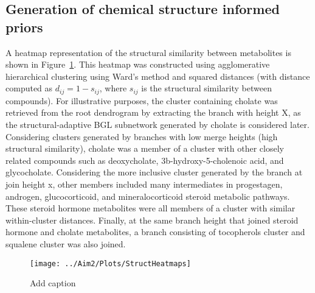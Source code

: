 \begin{DoubleSpace*}
\section{Generation of chemical structure informed priors}
A heatmap representation of the structural similarity between metabolites is shown in Figure~\ref{fig:heatmap}. This heatmap was constructed using agglomerative hierarchical clustering using Ward’s method and squared distances (with distance computed as $d_{ij}=1-s_{ij}$, where $s_{ij}$ is the structural similarity between compounds). For illustrative purposes, the cluster containing cholate was retrieved from the root dendrogram by extracting the branch with height X, as the structural-adaptive BGL subnetwork generated by cholate is considered later. Considering clusters generated by branches with low merge heights (high structural similarity), cholate was a member of a cluster with other closely related compounds such as deoxycholate, 3b-hydroxy-5-cholenoic acid, and glycocholate. Considering the more inclusive cluster generated by the branch at join height x, other members included many intermediates in progestagen, androgen, glucocorticoid, and mineralocorticoid steroid metabolic pathways. These steroid hormone metabolites were all members of a cluster with similar within-cluster distances. Finally, at the same branch height that joined steroid hormone and cholate metabolites, a branch consisting of tocopherols cluster and squalene cluster was also joined.
\end{DoubleSpace*}
	
\newpage
{}
\recalctypearea
\begin{figure}[ht]
	\texttt{[image: ../Aim2/Plots/StructHeatmaps]}
	\caption[Add caption]{Add caption \label{fig:heatmap} }
\end{figure}
\newpage
{}
\recalctypearea


